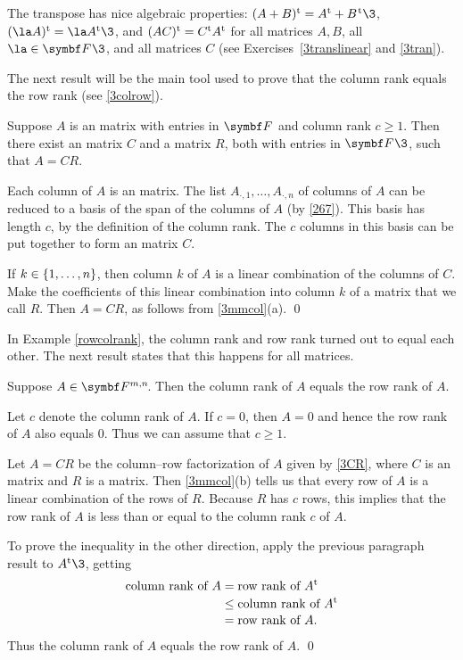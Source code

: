 The transpose has nice algebraic properties: $\tran{(A+B)} = \tran{A} + \tran{B\hspace{.08em}}\3$, $\tran{(\la A)} = \la \tran{A}\3$, and
$(AC)^{\text{t}} = C^{\text{t}} A^{\text{t}}$ for all  matrices $A, B$, all $\la \in \F{}\3$, and all  matrices $C$ (see Exercises~\ref{3translinear} and \ref{3tran}).

The next result will be the main tool used to prove that the column rank equals the row rank (see \ref{3colrow}).

{Suppose $A$ is an  matrix with entries in $\F{}$ and column rank $c \ge 1$.
Then there exist an  matrix $C$ and a  matrix $R$, both with entries in $\F{}\3$, such that
$A = CR$.}

\proof
Each column of $A$ is an  matrix. The list $A_{\cdot, 1}, \ldots, A_{\cdot, n}$ of columns of $A$ can be reduced to a basis of the span of the columns of $A$ (by \ref{267}). This basis has length $c$, by the definition of the column rank. The $c$ columns in this basis can be put together to form an  matrix $C$.

If $k \in \{1, \ldots, n\}$, then column $k$ of $A$ is a linear combination of the columns of $C$. Make the coefficients of this linear combination into column $k$ of a  matrix that we call $R$. Then $A = CR$, as follows from \ref{3mmcol}(a).
\qed

In Example \ref{rowcolrank}, the column rank and row rank turned out to equal each other. The next result states that this happens for all matrices.

{Suppose $A \in \FF{m, n}$. Then the column rank of $A$ equals the row rank of $A$.}

\proof
Let $c$ denote the column rank of $A$. If $c = 0$, then $A = 0$ and hence the row rank of $A$ also equals $0$. Thus we can assume that $c \ge 1$.

Let $A = CR$ be the column--row factorization of $A$ given by \ref{3CR}, where $C$ is an  matrix and $R$ is a  matrix. Then \ref{3mmcol}(b) tells us that every row of $A$ is a linear combination of the rows of $R$. Because $R$ has $c$ rows, this implies that the row rank of $A$ is less than or equal to the column rank $c$ of $A$.

To prove the inequality in the other direction, apply the previous paragraph result to $\tran{A}\3$, getting
\vspace{-.13in} %
\begin{align*}
\text{column rank of } A &= \text{row rank of } A^{\text{t}}\\[-2bp]
&\le \text{column rank of } A^{\text{t}}\\[-2bp]
&= \text{row rank of } A.
\end{align*}
\vspace{-.1in}
Thus the column rank of $A$ equals the row rank of $A$.
\qed

